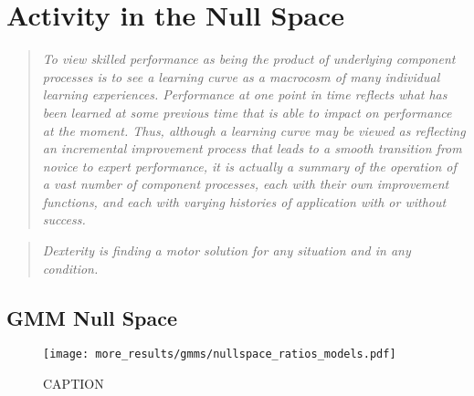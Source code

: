 \documentclass[../main.tex]{subfiles}
\begin{document}
\chapter{Activity in the Null Space}\label{chap:nullspace}

\begin{quote}
  \emph{To view skilled performance as being the product of underlying component processes is to see a learning curve as a macrocosm of many individual learning experiences. Performance at one point in time reflects what has been learned at some previous time that is able to impact on performance at the moment. Thus, although a learning curve may be viewed as reflecting an incremental improvement process that leads to a smooth transition from novice to expert performance, it is actually a summary of the operation of a vast number of component processes, each with their own improvement functions, and each with varying histories of application with or without success.}\\
\end{quote}

\begin{quote}
  \emph{Dexterity is finding a motor solution for any situation and in any condition.}\\
\end{quote}


\cleardoublepage%

\section{GMM Null Space}


\begin{figure}[tph]
  \centering
  \texttt{[image: more\_results/gmms/nullspace\_ratios\_models.pdf]}
  \caption[Nullspace activity for GMMs]{CAPTION}\label{fig:nullspace_gmms}
\end{figure}
\end{document}
